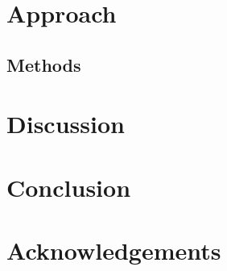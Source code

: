 \documentclass{bioinfo}
\begin{document}
\section{Approach}


\begin{methods}
\section{Methods}


\end{methods}


\section{Discussion}

\section{Conclusion}

\section{Acknowledgements}


%
%
%
%
%
%
%




\end{document}

